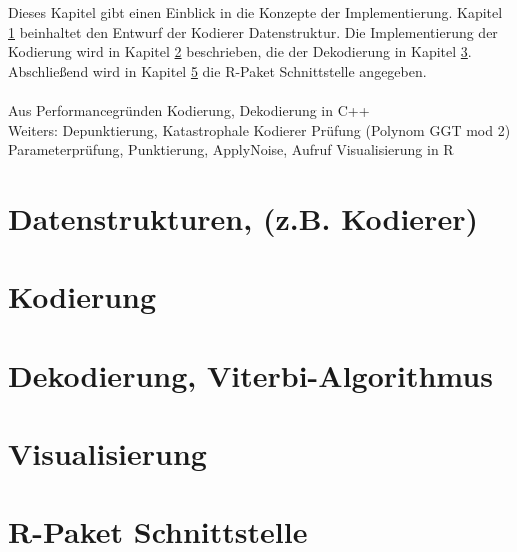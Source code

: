 Dieses Kapitel gibt einen Einblick in die Konzepte der Implementierung. Kapitel \ref{kapitel:implementierung_datenstruktur} beinhaltet den Entwurf der Kodierer Datenstruktur. Die Implementierung der Kodierung wird in Kapitel \ref{kapitel:implementierung_kodierung} beschrieben, die der Dekodierung in Kapitel \ref{kapitel:implementierung_dekodierung}. Abschließend wird in Kapitel \ref{kapitel:interface} die R-Paket Schnittstelle angegeben.
\\
\\
Aus Performancegründen Kodierung, Dekodierung in C++\\
Weiters: Depunktierung, Katastrophale Kodierer Prüfung (Polynom GGT mod 2)\\
Parameterprüfung, Punktierung, ApplyNoise, Aufruf Visualisierung in R\\

\section{Datenstrukturen, (z.B. Kodierer)}
\label{kapitel:implementierung_datenstruktur}

\section{Kodierung}
\label{kapitel:implementierung_kodierung}

\section{Dekodierung, Viterbi-Algorithmus}
\label{kapitel:implementierung_dekodierung}

\section{Visualisierung}
\label{kapitel:implementierung_visualisierung}

\section{R-Paket Schnittstelle}
\label{kapitel:interface}
